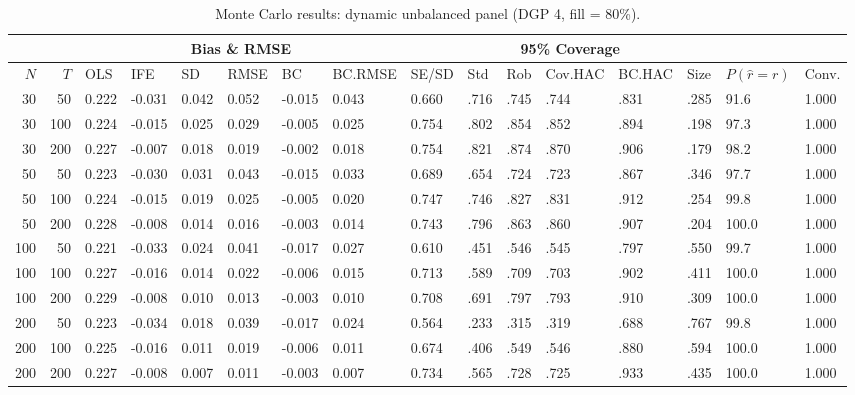 \begin{table}[ht]
\centering
\caption{Monte Carlo results: dynamic unbalanced panel (DGP 4, fill = 80\%).} 
\label{tab:mc_dyn_unb_f80}
\begin{tabular}{rrllllllllllllll}
  \hline
 & & \multicolumn{6}{c}{Bias \& RMSE} & & \multicolumn{4}{c}{95\% Coverage} & & & \\
\cline{3-8}\cline{10-13}
 \hline
$N$ & $T$ & OLS & IFE & SD & RMSE & BC & BC.RMSE & SE/SD & Std & Rob & Cov.HAC & BC.HAC & Size & $P(\hat r=r)$ & Conv. \\ 
  \hline
30 & 50 & 0.222 & -0.031 & 0.042 & 0.052 & -0.015 & 0.043 & 0.660 & .716 & .745 & .744 & .831 & .285 & 91.6 & 1.000 \\ 
  30 & 100 & 0.224 & -0.015 & 0.025 & 0.029 & -0.005 & 0.025 & 0.754 & .802 & .854 & .852 & .894 & .198 & 97.3 & 1.000 \\ 
  30 & 200 & 0.227 & -0.007 & 0.018 & 0.019 & -0.002 & 0.018 & 0.754 & .821 & .874 & .870 & .906 & .179 & 98.2 & 1.000 \\ 
  50 & 50 & 0.223 & -0.030 & 0.031 & 0.043 & -0.015 & 0.033 & 0.689 & .654 & .724 & .723 & .867 & .346 & 97.7 & 1.000 \\ 
  50 & 100 & 0.224 & -0.015 & 0.019 & 0.025 & -0.005 & 0.020 & 0.747 & .746 & .827 & .831 & .912 & .254 & 99.8 & 1.000 \\ 
  50 & 200 & 0.228 & -0.008 & 0.014 & 0.016 & -0.003 & 0.014 & 0.743 & .796 & .863 & .860 & .907 & .204 & 100.0 & 1.000 \\ 
  100 & 50 & 0.221 & -0.033 & 0.024 & 0.041 & -0.017 & 0.027 & 0.610 & .451 & .546 & .545 & .797 & .550 & 99.7 & 1.000 \\ 
  100 & 100 & 0.227 & -0.016 & 0.014 & 0.022 & -0.006 & 0.015 & 0.713 & .589 & .709 & .703 & .902 & .411 & 100.0 & 1.000 \\ 
  100 & 200 & 0.229 & -0.008 & 0.010 & 0.013 & -0.003 & 0.010 & 0.708 & .691 & .797 & .793 & .910 & .309 & 100.0 & 1.000 \\ 
  200 & 50 & 0.223 & -0.034 & 0.018 & 0.039 & -0.017 & 0.024 & 0.564 & .233 & .315 & .319 & .688 & .767 & 99.8 & 1.000 \\ 
  200 & 100 & 0.225 & -0.016 & 0.011 & 0.019 & -0.006 & 0.011 & 0.674 & .406 & .549 & .546 & .880 & .594 & 100.0 & 1.000 \\ 
  200 & 200 & 0.227 & -0.008 & 0.007 & 0.011 & -0.003 & 0.007 & 0.734 & .565 & .728 & .725 & .933 & .435 & 100.0 & 1.000 \\ 
   \hline
\end{tabular}
\end{table}
